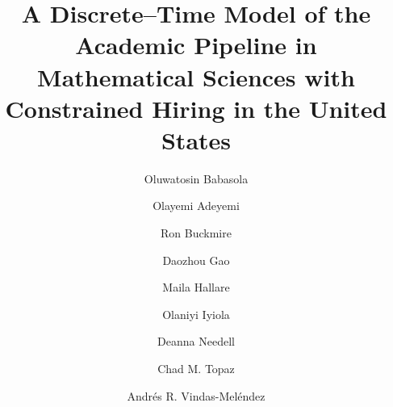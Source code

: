 \documentclass[3p]{elsarticle}%
\theoremstyle{definition}
\begin{document}
	\begin{frontmatter}
		
		\title{\textbf{A Discrete--Time Model of the Academic Pipeline in Mathematical Sciences with Constrained Hiring in the United States
}}
		
		\author[author1]{Oluwatosin Babasola}	
		\author[author2]{Olayemi Adeyemi }	
        \author[author3]{Ron Buckmire}	
		\author[author4]{Daozhou Gao}	
        \author[author5]{Maila Hallare}
  \author[author6]{Olaniyi Iyiola}
  \author[author7]{Deanna Needell}
  \author[author8,author9,author10]{Chad M. Topaz}
        \author[author11]{Andr\'es R. Vindas-Mel\'endez}	


\address[author1]{ University of Georgia, Athens, GA, USA}
\address[author2]{Boise State University, Boise, ID, USA}
\address[author3]  {Marist University,  Poughkeepsie, NY ,  USA}
\address[author4]  {Cleveland State University,  Cleveland , OH ,  USA}
\address[author5]  {United States Air Force Academy, CO ,  USA}
\address[author6]  {Morgan State University,  Baltimore, MD ,  USA}
\address[author7]  {University of California,  Los Angeles, CA ,  USA}
\address[author8]{Williams College, Williamstown, MA, USA}
\address[author9]  {QSIDE Institute, Williamstown , MA,  USA}
\address[author10]  {University of Colorado,  Boulder, CO ,  USA}
\address[author11]  {Harvey Mudd College,  Claremont, CA ,  USA}


\end{frontmatter}
\end{document}
